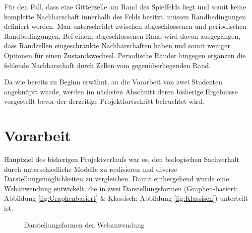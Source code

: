 \documentclass[11pt,a4paper,pointlessnumbers]{scrreprt}  %
\begin{document}
Für den Fall, dass eine Gitterzelle am Rand des Spielfelds liegt und somit keine komplette Nachbarschaft innerhalb des Felds besitzt, müssen Randbedingungen definiert werden. Man unterscheidet zwischen abgeschlossenen und periodischen Randbedingungen. Bei einem abgeschlossenen Rand wird davon ausgegangen, dass Randzellen eingeschränkte Nachbarschaften haben und somit weniger Optionen für einen Zustandswechsel. Periodische Ränder hingegen ergänzen die fehlende Nachbarschaft durch Zellen vom gegenüberliegenden Rand. \par

Da wie bereits zu Beginn erwähnt, an die Vorarbeit von zwei Studenten angeknüpft wurde, werden im nächsten Abschnitt deren bisherige Ergebnisse vorgestellt bevor der derzeitige Projektfortschritt beleuchtet wird.


\chapter{Vorarbeit}
Hauptziel des bisherigen Projektverlaufs war es, den biologischen Sachverhalt durch unterschiedliche Modelle zu realisieren und diverse Darstellungsmöglichkeiten zu vergleichen. Damit einhergehend wurde eine Webanwendung entwickelt, die in zwei Darstellungsformen (Graphen-basiert: Abbildung \ref{fig:Graphenbasiert} \& Klassisch: Abbildung \ref{fig:Klassisch}) unterteilt ist. 

\begin{figure}[!ht]
	\centering
	\caption{Darstellungsformen der Webanwendung \cite{Zellsimulator}} 
\end{figure} 
\end{document}
